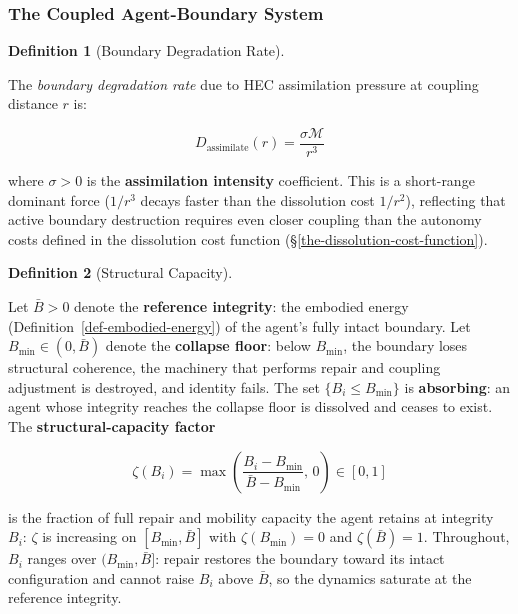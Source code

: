 \documentclass[11pt]{article}
\theoremstyle{plain}
\theoremstyle{definition}
\newtheorem{definition}{Definition}
\theoremstyle{remark}
\let\origsubsubsection\subsubsection
\renewcommand{\subsubsection}{\needspace{4\baselineskip}\origsubsubsection}
\begin{document}
\subsubsection{The Coupled Agent-Boundary
System}\label{the-coupled-agent-boundary-system}

\begin{definition}[Boundary Degradation Rate]
\label{def-boundary-degradation-rate}

The \emph{boundary degradation rate} due to HEC assimilation pressure at coupling distance $r$ is:

$$D_{\text{assimilate}}(r) = \frac{\sigma \mathcal{M}}{r^3}$$

where $\sigma > 0$ is the \textbf{assimilation intensity} coefficient. This is a short-range dominant force ($1/r^3$ decays faster than the dissolution cost $1/r^2$), reflecting that active boundary destruction requires even closer coupling than the autonomy costs defined in the dissolution cost function (§\ref{the-dissolution-cost-function}).
\end{definition}

\begin{definition}[Structural Capacity]
\label{def-structural-capacity}

Let $\bar{B} > 0$ denote the \textbf{reference integrity}: the embodied energy (Definition~\ref{def-embodied-energy}) of the agent's fully intact boundary. Let $B_{\min} \in (0, \bar{B})$ denote the \textbf{collapse floor}: below $B_{\min}$, the boundary loses structural coherence, the machinery that performs repair and coupling adjustment is destroyed, and identity fails. The set $\{B_i \leq B_{\min}\}$ is \textbf{absorbing}: an agent whose integrity reaches the collapse floor is dissolved and ceases to exist. The \textbf{structural-capacity factor}

$$\zeta(B_i) = \max\left(\frac{B_i - B_{\min}}{\bar{B} - B_{\min}},\, 0\right) \in [0, 1]$$

is the fraction of full repair and mobility capacity the agent retains at integrity $B_i$: $\zeta$ is increasing on $[B_{\min}, \bar{B}]$ with $\zeta(B_{\min}) = 0$ and $\zeta(\bar{B}) = 1$. Throughout, $B_i$ ranges over $(B_{\min}, \bar{B}]$: repair restores the boundary toward its intact configuration and cannot raise $B_i$ above $\bar{B}$, so the dynamics saturate at the reference integrity.
\end{definition}
\end{document}
